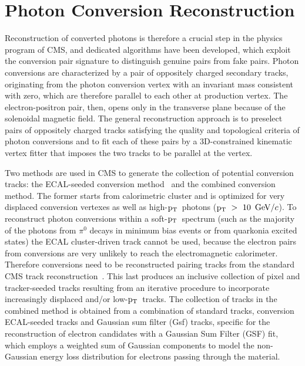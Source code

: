 \documentclass[a4paper]{jpconf}
\def \pt{$\p_{\rm T}$~}
\begin{document}

\section{Photon Conversion Reconstruction}
\label{standard}


Reconstruction of converted photons is therefore a crucial step in the physics program of CMS, and dedicated algorithms have been developed, which exploit the conversion pair signature to distinguish genuine pairs from fake pairs.
%
Photon conversions are characterized by a pair of
oppositely charged secondary tracks, originating from the photon conversion vertex with an
invariant mass consistent with zero,  which are therefore parallel
to each other at production vertex. The electron-positron pair, then,
opens only in the transverse plane because of the solenoidal magnetic field.
The general reconstruction approach is to preselect pairs of oppositely charged tracks satisfying the quality and topological criteria of photon conversions and to fit each of these pairs by a 3D-constrained kinematic vertex 
fitter that imposes the two tracks to be parallel at the vertex. 

Two methods are used in CMS to generate the collection of potential conversion tracks: the ECAL-seeded conversion method~\cite{ecalseeded}  and the combined conversion method. The former starts from calorimetric cluster and is optimized for very displaced conversion vertexes as well as high-\pt photons (\pt$>~10~{\rm \, GeV}/c$).
To reconstruct photon conversions within a soft-\pt spectrum (such as the majority of the photons from $\pi^0$ decays in minimum bias events or from quarkonia excited states) the ECAL cluster-driven track cannot be used,  because the electron pairs from conversions are very unlikely to reach the electromagnetic calorimeter.
Therefore  conversions need to be reconstructed pairing tracks from the standard CMS track reconstruction~\cite{TRK-10-001}. This last produces an inclusive collection of pixel and tracker-seeded tracks resulting from an iterative procedure to incorporate increasingly displaced and/or low-\pt tracks.
The collection of tracks in the combined method is obtained from a combination of standard 	tracks,  conversion ECAL-seeded tracks and Gaussian sum filter (Gsf) tracks, specific for the reconstruction of electron candidates with a Gaussian Sum Filter (GSF) fit, which employs a weighted  	sum of Gaussian components to model the non-Gaussian energy loss distribution for electrons passing through the material. 
\end{document}
